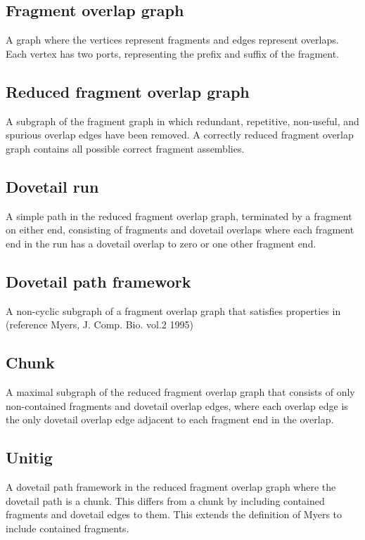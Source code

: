 \documentclass{article}
\begin{document}
\subsection{Fragment overlap graph}
  A graph where the vertices represent fragments and edges represent
overlaps. Each vertex has two ports, representing the prefix and
suffix of the fragment.

\subsection{Reduced fragment overlap graph}
  A subgraph of the fragment graph in which redundant, repetitive,
non-useful, and spurious overlap edges have been removed. A correctly
reduced fragment overlap graph contains all possible correct fragment
assemblies.

\subsection{Dovetail run}
  A simple path in the reduced fragment overlap graph, terminated by a
fragment on either end, consisting of fragments and dovetail overlaps
where each fragment end in the run has a dovetail overlap to zero or
one other fragment end.

\subsection{Dovetail path framework}
  A non-cyclic subgraph of a fragment overlap graph that satisfies
properties in (reference Myers, J. Comp. Bio. vol.2 1995)

\subsection{Chunk}
  A maximal subgraph of the reduced fragment overlap graph that
consists of only non-contained fragments and dovetail overlap edges,
where each overlap edge is the only dovetail overlap edge adjacent to
each fragment end in the overlap.

\subsection{Unitig}
  A dovetail path framework in the reduced fragment overlap graph
where the dovetail path is a chunk. This differs from a chunk by
including contained fragments and dovetail edges to them. This extends
the definition of Myers to include contained fragments.
\end{document}

